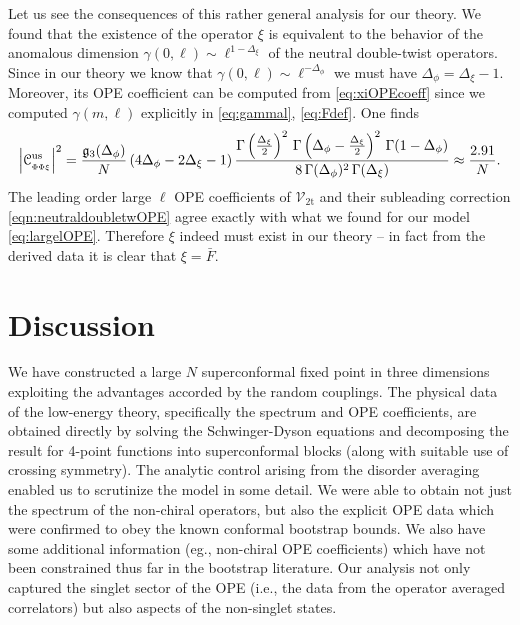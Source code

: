 \documentclass[11pt]{article}
\newcommand{\Fb}{\bar{F}}
\newcommand{\cope}[1]{\mathcal{C}_{_{#1}}}
\begin{document}
Let us see the consequences of this rather general analysis for our theory. We found that the existence of the operator $\xi$ is equivalent to the behavior of the anomalous dimension $\gamma(0,\ell) \sim \ell^{1-\Delta_{\xi}}$ of the neutral double-twist operators. Since in our theory  we know that $\gamma(0,\ell) \sim \ell^{-\Delta_{\phi}}$ we must have  $\Delta_{\phi} = \Delta_{\xi}-1$. Moreover, its OPE coefficient can be computed from \eqref{eq:xiOPEcoeff} since we computed $\gamma(m,\ell)$ explicitly in \eqref{eq:gammal}, \eqref{eq:Fdef}.  One finds
%
\begin{equation}\label{eq:xiOPEcoeffus}
\abs{\cope{\Phi\Phi \xi}^{\mathrm{us}}}^{2} 
= 
  \frac{\mathfrak{g}_{3}(\Delta_{\phi})}{N}\, (4\Delta_{\phi}-2\Delta_{\xi}-1) \, 
  \frac{\Gamma\left(\frac{\Delta_\xi}{2}\right)^2\,  \Gamma\left(\Delta_\phi-\frac{\Delta_\xi}{2}\right)^2\, 
  \Gamma(1-\Delta_\phi)}{8\, \Gamma(\Delta_\phi)^2\,\Gamma(\Delta_\xi) }
 \approx \frac{2.91}{N}.
\end{equation}
%
The leading order large $\ell$ OPE coefficients of $\mathcal{V}_{\mathrm{2t}}$ and their subleading correction \eqref{eqn:neutraldoubletwOPE} agree exactly with what we found for our model \eqref{eq:largelOPE}. Therefore $\xi$ indeed must exist in our theory -- in fact from the derived data it is clear that $\xi = \Fb$. 

\section{Discussion}
\label{sec:discuss}

We have constructed a  large $N$ superconformal fixed point in three dimensions exploiting the advantages accorded by the random couplings. The physical data of the low-energy theory, specifically the spectrum and OPE coefficients, are  obtained directly by solving the Schwinger-Dyson equations and decomposing the result for 4-point functions into superconformal blocks (along with suitable use of crossing symmetry). The analytic control  arising from the disorder averaging enabled us to scrutinize the model in some detail. 
We were able to obtain not just the spectrum of the non-chiral operators, but also the explicit OPE data which were confirmed to obey the known conformal bootstrap bounds. We also have some additional information (eg., non-chiral OPE coefficients) which have not  been constrained  thus far in the bootstrap literature. Our analysis not only captured the singlet sector of the OPE (i.e., the data from the operator averaged correlators) but also aspects of the non-singlet states.
\end{document}
